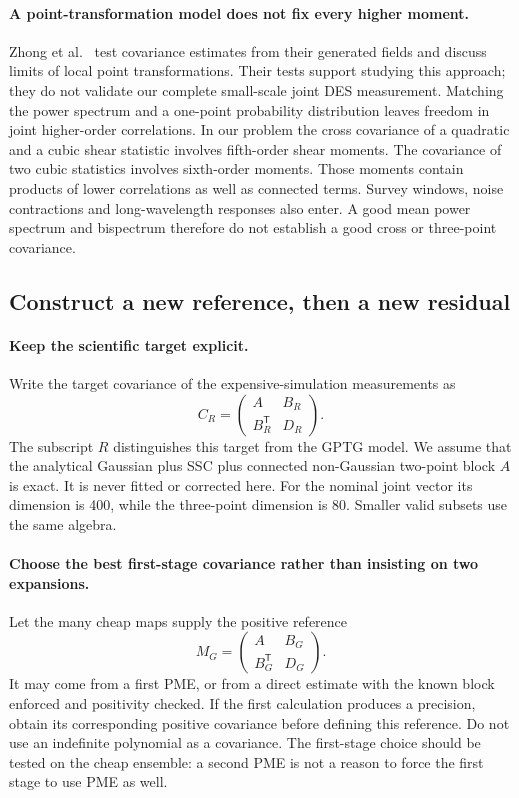 \documentclass[11pt]{article}
\begin{document}
\paragraph{A point-transformation model does not fix every higher moment.}
Zhong et al.~\cite{gptg} test covariance estimates from their generated
fields and discuss limits of local point transformations. Their tests
support studying this approach; they do not validate our complete
small-scale joint DES measurement. Matching the power spectrum and a
one-point probability distribution leaves freedom in joint higher-order
correlations. In our problem the cross covariance of a quadratic and a
cubic shear statistic involves fifth-order shear moments. The covariance
of two cubic statistics involves sixth-order moments. Those moments contain
products of lower correlations as well as connected terms. Survey windows,
noise contractions and long-wavelength responses also enter. A good mean
power spectrum and bispectrum therefore do not establish a good cross or
three-point covariance.

\subsection{Construct a new reference, then a new residual}

\paragraph{Keep the scientific target explicit.}
Write the target covariance of the expensive-simulation measurements as
\begin{equation}
 C_R=\begin{pmatrix}A&B_R\\B_R^{\mathsf T}&D_R\end{pmatrix}.
\end{equation}
The subscript $R$ distinguishes this target from the GPTG model. We assume
that the analytical Gaussian plus SSC plus connected non-Gaussian
two-point block $A$ is exact. It is never fitted or corrected here. For
the nominal joint vector its dimension is 400, while the three-point
dimension is 80. Smaller valid subsets use the same algebra.

\paragraph{Choose the best first-stage covariance rather than insisting
on two expansions.}
Let the many cheap maps supply the positive reference
\begin{equation}
 M_G=\begin{pmatrix}A&B_G\\B_G^{\mathsf T}&D_G\end{pmatrix}.
\end{equation}
It may come from a first PME, or from a direct estimate with the known
block enforced and positivity checked. If the first calculation produces
a precision, obtain its corresponding positive covariance before defining
this reference. Do not use an indefinite polynomial as a covariance.
The first-stage choice should be tested on the cheap ensemble: a second
PME is not a reason to force the first stage to use PME as well.
\end{document}
